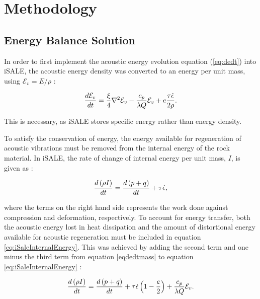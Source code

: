 \section{Methodology}

\subsection{Energy Balance Solution}

In order to first implement the acoustic energy evolution equation (\ref{eq:dedt}) into iSALE, the acoustic energy density was converted to an energy per unit mass, using $\mathcal{E}_{v}=E/\rho$ \citep{collins2003acoustic}:

\begin{equation}\label{eqdedtmass}
\frac{d \mathcal{E}_{v}}{d t} = \frac{\xi}{4} \nabla^{2}\mathcal{E}_{v} - \frac{c_{p}}{\lambda Q}\mathcal{E}_{v} + e \frac{\tau \dot{\epsilon}}{2\rho}.\vspace{0.2cm}
\end{equation}

This is necessary, as iSALE stores specific energy rather than energy density.

To satisfy the conservation of energy, the energy available for regeneration of acoustic vibrations must be removed from the internal energy of the rock material. In iSALE, the rate of change of internal energy per unit mass, $I$, is given as \citep{collins2002numerical}:

\begin{equation}\label{eq:iSaleInternalEnergy}
\frac{d \left( \rho I\right)}{d t} =\frac{d \left(p + q\right)}{d t} + \tau \dot{\epsilon},\vspace{0.2cm}
\end{equation}

where the terms on the right hand side represents the work done against compression and deformation, respectively. To account for energy transfer, both the acoustic energy lost in heat dissipation and the amount of distortional energy available for acoustic regeneration must be included in equation \ref{eq:iSaleInternalEnergy}. This was achieved by adding the second term and one minus the third term from equation \ref{eqdedtmass} to equation \ref{eq:iSaleInternalEnergy} \citep{collins2002numerical}:

\begin{equation}\label{eq:iSaleInternalEnergyAcoustic}
\frac{d \left(\rho I\right)}{d t} =\frac{d \left(p + q\right)}{d t} + \tau \dot{\epsilon}\left(1-\frac{e}{2}\right)+\frac{c_{p}}{\lambda Q}\mathcal{E}_{v}.\vspace{0.2cm}
\end{equation}

